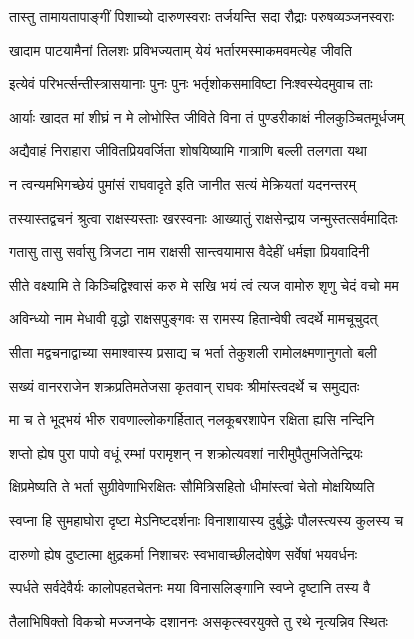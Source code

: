 \twolineshloka
{तास्तु तामायतापाङ्गीं पिशाच्यो दारुणस्वराः}
{तर्जयन्ति सदा रौद्राः परुषव्यञ्जनस्वराः}


\twolineshloka
{खादाम पाटयामैनां तिलशः प्रविभज्यताम्}
{येयं भर्तारमस्माकमवमत्येह जीवति}


\twolineshloka
{इत्येवं परिभर्त्सन्तीस्त्रासयानाः पुनः पुनः}
{भर्तृशोकसमाविष्टा निःश्वस्येदमुवाच ताः}


\twolineshloka
{आर्याः खादत मां शीघ्रं न मे लोभोस्ति जीविते}
{विना तं पुण्डरीकाक्षं नीलकुञ्चितमूर्धजम्}


\twolineshloka
{अद्यैवाहं निराहारा जीवितप्रियवर्जिता}
{शोषयिष्यामि गात्राणि बल्ली तलगता यथा}


\twolineshloka
{न त्वन्यमभिगच्छेयं पुमांसं राघवादृते}
{इति जानीत सत्यं मेक्रियतां यदनन्तरम्}


\twolineshloka
{तस्यास्तद्वचनं श्रुत्वा राक्षस्यस्ताः खरस्वनाः}
{आख्यातुं राक्षसेन्द्राय जन्मुस्तत्सर्वमादितः}


\twolineshloka
{गतासु तासु सर्वासु त्रिजटा नाम राक्षसी}
{सान्त्वयामास वैदेहीं धर्मज्ञा प्रियवादिनी}


\twolineshloka
{सीते वक्ष्यामि ते किञ्चिद्विश्वासं करु मे सखि}
{भयं त्वं त्यज वामोरु शृणु चेदं वचो मम}


\twolineshloka
{अविन्ध्यो नाम मेधावी वृद्धो राक्षसपुङ्गवः}
{स रामस्य हितान्वेषी त्वदर्थे मामचूचुदत्}


\twolineshloka
{सीता मद्वचनाद्वाच्या समाश्वास्य प्रसाद्य च}
{भर्ता तेकुशली रामोलक्ष्मणानुगतो बली}


\twolineshloka
{सख्यं वानरराजेन शक्रप्रतिमतेजसा}
{कृतवान् राघवः श्रीमांस्त्वदर्थे च समुद्यतः}


\twolineshloka
{मा च ते भूद्भयं भीरु रावणाल्लोकगर्हितात्}
{नलकूबरशापेन रक्षिता ह्यसि नन्दिनि}


\twolineshloka
{शप्तो ह्येष पुरा पापो वधूं रम्भां परामृशन्}
{न शक्रोत्यवशां नारीमुपैतुमजितेन्द्रियः}


\twolineshloka
{क्षिप्रमेष्यति ते भर्ता सुग्रीवेणाभिरक्षितः}
{सौमित्रिसहितो धीमांस्त्वां चेतो मोक्षयिष्यति}


\twolineshloka
{स्वप्ना हि सुमहाघोरा दृष्टा मेऽनिष्टदर्शनाः}
{विनाशायास्य दुर्बुद्धेः पौलस्त्यस्य कुलस्य च}


\twolineshloka
{दारुणो ह्येष दुष्टात्मा क्षुद्रकर्मा निशाचरः}
{स्वभावाच्छीलदोषेण सर्वेषां भयवर्धनः}


\twolineshloka
{स्पर्धते सर्वदेवैर्यः कालोपहतचेतनः}
{मया विनासलिङ्गानि स्वप्ने दृष्टानि तस्य वै}


\twolineshloka
{तैलाभिषिक्तो विकचो मज्जनप्के दशाननः}
{असकृत्स्वरयुक्ते तु रथे नृत्यन्निव स्थितः}


